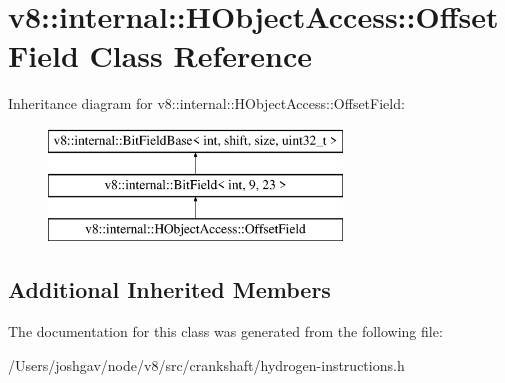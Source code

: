 \hypertarget{classv8_1_1internal_1_1_h_object_access_1_1_offset_field}{}\section{v8\+:\+:internal\+:\+:H\+Object\+Access\+:\+:Offset\+Field Class Reference}
\label{classv8_1_1internal_1_1_h_object_access_1_1_offset_field}
Inheritance diagram for v8\+:\+:internal\+:\+:H\+Object\+Access\+:\+:Offset\+Field\+:\begin{figure}[H]
\begin{center}
\leavevmode
\includegraphics[height=3.000000cm]{classv8_1_1internal_1_1_h_object_access_1_1_offset_field}
\end{center}
\end{figure}
\subsection*{Additional Inherited Members}


The documentation for this class was generated from the following file\+:\begin{DoxyCompactItemize}
\item 
/\+Users/joshgav/node/v8/src/crankshaft/hydrogen-\/instructions.\+h\end{DoxyCompactItemize}
